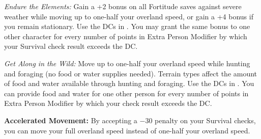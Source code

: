 \textit{Endure the Elements:} Gain a +2 bonus on all Fortitude saves against severe weather while moving up to one-half your overland speed, or gain a +4 bonus if you remain stationary. Use the DCs in . You may grant the same bonus to one other character for every number of points in Extra Person Modifier by which your Survival check result exceeds the DC.


\textit{Get Along in the Wild:} Move up to one-half your overland speed while hunting and foraging (no food or water supplies needed). Terrain types affect the amount of food and water available through hunting and foraging. Use the DCs in . You can provide food and water for one other person for every number of points in Extra Person Modifier by which your check result exceeds the DC.


\textbf{Accelerated Movement:} By accepting a $-30$ penalty on your Survival checks, you can move your full overland speed instead of one-half your overland speed.

